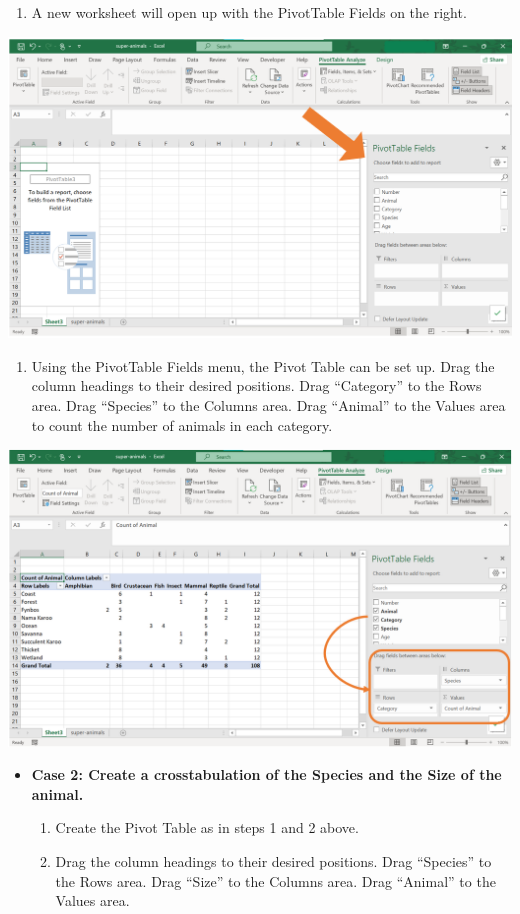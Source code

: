 \documentclass[
]{book}
\providecommand{\tightlist}{%
  \setlength{\itemsep}{0pt}\setlength{\parskip}{0pt}}
\begin{document}
\begin{enumerate}
\def\labelenumi{\arabic{enumi}.}
\setcounter{enumi}{2}
\tightlist
\item
  A new worksheet will open up with the PivotTable Fields on the right.
\end{enumerate}

\begin{center}\includegraphics[width=0.8\linewidth]{Figures/pivot_3} \end{center}

\newpage

\begin{enumerate}
\def\labelenumi{\arabic{enumi}.}
\setcounter{enumi}{3}
\tightlist
\item
  Using the PivotTable Fields menu, the Pivot Table can be set up. Drag the column headings to their desired positions. Drag ``Category'' to the Rows area. Drag ``Species'' to the Columns area. Drag ``Animal'' to the Values area to count the number of animals in each category.
\end{enumerate}

\begin{center}\includegraphics[width=0.8\linewidth]{Figures/pivot_4} \end{center}

\begin{itemize}
\item
  \textbf{Case 2: Create a crosstabulation of the Species and the Size of the animal.}

  \begin{enumerate}
  \def\labelenumi{\arabic{enumi}.}
  \item
    Create the Pivot Table as in steps 1 and 2 above.
  \item
    Drag the column headings to their desired positions. Drag ``Species'' to the Rows area. Drag ``Size'' to the Columns area. Drag ``Animal'' to the Values area.
  \end{enumerate}
\end{itemize}
\end{document}

